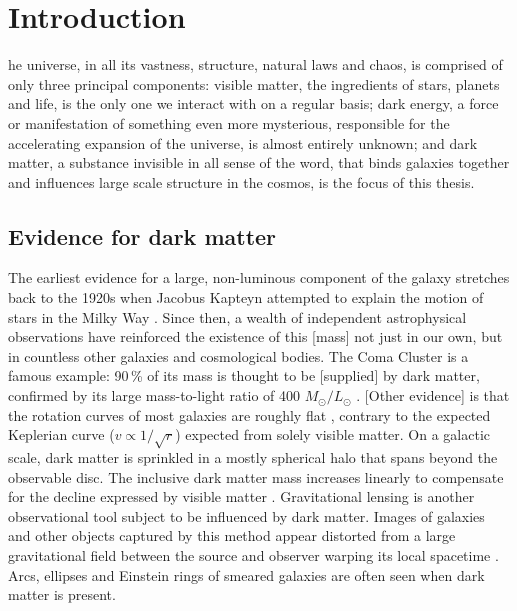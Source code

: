 %
%
\let\textcircled=\pgftextcircled
\chapter{Introduction}
\label{chap:intro}


he universe, in all its vastness, structure, natural laws and chaos, is comprised of only three principal components: visible matter, the ingredients of stars, planets and life, is the only one we interact with on a regular basis; dark energy, a force or manifestation of something even more mysterious, responsible for the accelerating expansion of the universe, is almost entirely unknown; and dark matter, a substance invisible in all sense of the word, that binds galaxies together and influences large scale structure in the cosmos, is the focus of this thesis.


\section{Evidence for dark matter}
\label{sec:intro_dm_evidence}

The earliest evidence for a large, non-luminous component of the galaxy stretches back to the 1920s when Jacobus Kapteyn attempted to explain the motion of stars in the Milky Way \cite{1922ApJ....55..302K}. Since then, a wealth of independent astrophysical observations have reinforced the existence of this [mass] not just in our own, but in countless other galaxies and cosmological bodies. The Coma Cluster is a famous example: 90\,\% of its mass is thought to be [supplied] by dark matter, confirmed by its large mass-to-light ratio of 400 $M_{\odot} / L_{\odot}$ \cite{Yozin:2015mla}. [Other evidence] is that the rotation curves of most galaxies are roughly flat \cite{1996MNRAS-281-27P}, contrary to the expected Keplerian curve ($v \propto 1/\sqrt{r}$) expected from solely visible matter. On a galactic scale, dark matter is sprinkled in a mostly spherical halo that spans beyond the observable disc. The inclusive dark matter mass increases linearly \cite{2009arXiv0901.0632E} to compensate for the decline expressed by visible matter \cite{1970ApJ-160-811F,1992AandA-256-19B}. Gravitational lensing is another observational tool subject to be influenced by dark matter. Images of galaxies and other objects captured by this method appear distorted from a large gravitational field between the source and observer warping its local spacetime \cite{2010GReGr..42.2177H}. Arcs, ellipses and Einstein rings of smeared galaxies are often seen when dark matter is present.

